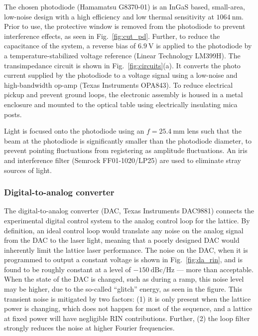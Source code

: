 \documentclass[twocolumn,aps,pra,showpacs,preprintnumbers,bibnotes]{revtex4-1}
\newcommand\unit[2]{\ensuremath{#1~\mathrm{{#2}}}}
\begin{document}
The chosen photodiode (Hamamatsu G8370-01) is an InGaS based, small-area, low-noise design with a high efficiency and low thermal sensitivity at \unit{1064}{nm}.
Prior to use, the protective window is removed from the photodiode to prevent interference effects, as seen in Fig.~\ref{fig:cut_pd}.
Further, to reduce the capacitance of the system, a reverse bias of \unit{6.9}{V} is applied to the photodiode by a temperature-stabilized voltage reference (Linear Technology LM399H).
The transimpedance circuit is shown in Fig.~\ref{fig:circuits}(a).
It converts the photo current supplied by the photodiode to a voltage signal using a low-noise and high-bandwidth op-amp (Texas Instruments OPA843).
To reduce electrical pickup and prevent ground loops, the electronic assembly is housed in a metal enclosure and mounted to the optical table using electrically insulating mica posts.

Light is focused onto the photodiode using an $f=\unit{25.4}{mm}$ lens such that the beam at the photodiode is significantly smaller than the photodiode diameter, to prevent pointing fluctuations from registering as amplitude fluctuations.
An iris and interference filter (Semrock FF01-1020/LP25) are used to eliminate stray sources of light.


\subsubsection{Digital-to-analog converter}
The digital-to-analog converter (DAC, Texas Instruments DAC9881) connects the experimental digital control system to the analog control loop for the lattice.
By definition, an ideal control loop would translate any noise on the analog signal from the DAC to the laser light, meaning that a poorly designed DAC would inherently limit the lattice laser performance.
The noise on the DAC, when it is programmed to output a constant voltage is shown in Fig.~\ref{fig:da_rin}, and is found to be roughly constant at a level of \unit{-150}{dBc/Hz} --- more than acceptable.
When the state of the DAC is changed, such as during a ramp, this noise level may be higher, due to the so-called ``glitch'' energy, as seen in the figure.
This transient noise is mitigated by two factors: (1) it is only present when the lattice power is changing, which does not happen for most of the sequence, and a lattice at fixed power will have negligible RIN contributions. Further, (2) the loop filter strongly reduces the noise at higher Fourier frequencies.
\end{document}
